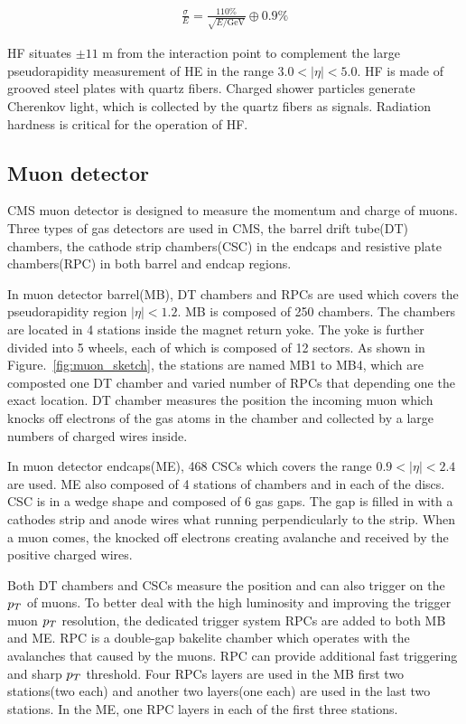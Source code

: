 \begin{align*}
\frac{\sigma}{E}=\frac{110\%}{\sqrt{E/\textrm{GeV}}}\oplus 0.9\%
\end{align*}

HF situates $\pm11$ m from the interaction point to complement the large pseudorapidity measurement of HE in the range $3.0<|\eta|<5.0$. HF is made of grooved steel plates with quartz fibers. Charged shower particles generate Cherenkov light, which is collected by the quartz fibers as signals. Radiation hardness is critical for the operation of HF.   



\subsection{Muon detector}
CMS muon detector is designed to measure the momentum and charge of muons. Three types of gas detectors are used in CMS, the   barrel drift tube(DT) chambers, the cathode strip chambers(CSC) in the endcaps and resistive plate chambers(RPC) in both barrel and endcap regions. 

In muon detector barrel(MB), DT chambers and RPCs are used which covers the pseudorapidity region $|\eta|<1.2$. MB is composed of 250 chambers. The chambers are located in 4 stations inside the magnet return yoke. The yoke is further divided into 5 wheels, each of which is composed of 12 sectors. As shown in Figure.~\ref{fig:muon_sketch}, the stations are named MB1 to MB4, which are composted one DT chamber and varied number of RPCs that depending one the exact location. DT chamber measures the position the incoming muon which knocks off electrons of the gas atoms in the chamber and collected by a large numbers of charged wires inside.%

In muon detector endcaps(ME), 468 CSCs which covers the range $0.9<|\eta|<2.4$ are used. ME also composed of 4 stations of chambers and in each of the discs. CSC is in a wedge shape and composed of 6 gas gaps. The gap is filled in with a cathodes strip and anode wires what running perpendicularly to the strip. When a muon comes, the knocked off electrons creating avalanche and received by the positive charged wires.  

Both DT chambers and CSCs measure the position and can also trigger on the $p_{T}$ of muons. To better deal with the high luminosity and improving the trigger muon $p_{T}$ resolution, the dedicated trigger system RPCs are added to both MB and ME. RPC is a double-gap bakelite chamber which operates with the avalanches that caused by the muons. RPC can provide additional fast triggering and sharp $p_{T}$ threshold. Four RPCs layers are used in the MB first two stations(two each) and another two layers(one each) are used in the last two stations.  In the ME, one RPC layers in each of the first three stations.    



